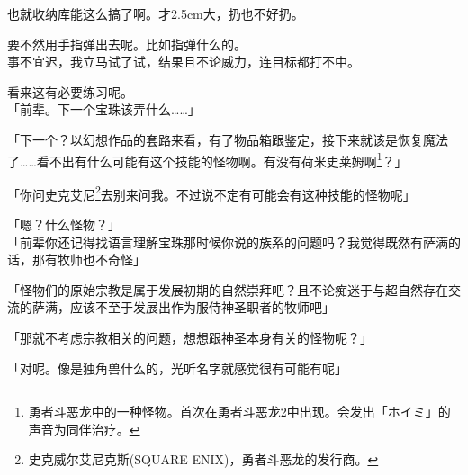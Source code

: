 也就收纳库能这么搞了啊。才2.5cm大，扔也不好扔。

要不然用手指弹出去呢。比如指弹什么的。\\

事不宜迟，我立马试了试，结果且不论威力，连目标都打不中。

看来这有必要练习呢。\\

「前辈。下一个宝珠该弄什么……」

「下一个？以幻想作品的套路来看，有了物品箱跟鉴定，接下来就该是恢复魔法了……看不出有什么可能有这个技能的怪物啊。有没有荷米史莱姆啊\footnote{勇者斗恶龙中的一种怪物。首次在勇者斗恶龙2中出现。会发出「ホイミ」的声音为同伴治疗。}？」

「你问史克艾尼\footnote{史克威尔艾尼克斯(SQUARE ENIX)，勇者斗恶龙的发行商。}去别来问我。不过说不定有可能会有这种技能的怪物呢」

「嗯？什么怪物？」\\

「前辈你还记得找语言理解宝珠那时候你说的族系的问题吗？我觉得既然有萨满的话，那有牧师也不奇怪」

「怪物们的原始宗教是属于发展初期的自然崇拜吧？且不论痴迷于与超自然存在交流的萨满，应该不至于发展出作为服侍神圣职者的牧师吧」

「那就不考虑宗教相关的问题，想想跟神圣本身有关的怪物呢？」

「对呢。像是独角兽什么的，光听名字就感觉很有可能有呢」

